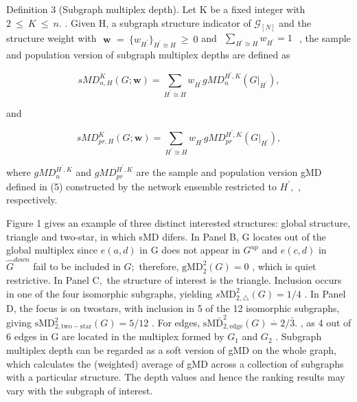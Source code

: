 \documentclass[
  10
]{article}
\begin{document}
Definition 3 (Subgraph multiplex depth). Let K be a fixed integer with
\(2 ~ \leq ~ K ~ \leq ~ n .\) . Given H, a subgraph structure indicator
of \(\mathcal { G } _ { [ N ] }\) and the structure weight with
\(\textbf { w } = \ \{ w _ { H ^ { \prime } } \} _ { H ^ { \prime } \cong H } \ \geq \ 0\)
and
\(\begin{array} { r } { \sum _ { H ^ { \prime } \cong H } w _ { H ^ { \prime } } = 1 } \end{array}\)
, the sample and population version of subgraph multiplex depths are
defined as

\[
s M D _ {n, H} ^ {K} (G; \mathbf {w}) = \sum_ {H ^ {\prime} \cong H} w _ {H ^ {\prime}} g M D _ {n} ^ {H ^ {\prime}, K} (G | _ {H ^ {\prime}}),
\]

and

\[
s M D _ {p r, H} ^ {K} (G; \mathbf {w}) = \sum_ {H ^ {\prime} \cong H} w _ {H ^ {\prime}} g M D _ {p r} ^ {H ^ {\prime}, K} (G | _ {H ^ {\prime}}),
\]

where \(g M D _ { n } ^ { H ^ { \prime } , K }\) and
\(g M D _ { p r } ^ { H ^ { \prime } , K }\) are the sample and
population version gMD defined in (5) constructed by the network
ensemble restricted to \(H ^ { \prime } { , }\) , respectively.

Figure 1 gives an example of three distinct interested structures:
global structure, triangle and two-star, in which sMD difers. In Panel
B, G locates out of the global multiplex since \(e ( a , d )\) in G does
not appear in \(G ^ { u p }\) and \(e ( c , d )\) in
\({ \hat { G } } ^ { d o w n }\) fail to be included in \(G ;\)
therefore, \(\mathrm { g M D } _ { 2 } ^ { 2 } ( G ) = 0\) , which is
quiet restrictive. In Panel \(\mathrm { C } ,\) the structure of
interest is the triangle. Inclusion occurs in one of the four isomorphic
subgraphs, yielding
\(s \mathrm { M D } _ { 2 , \triangle } ^ { 2 } ( G ) = 1 / 4\) . In
Panel D, the focus is on twostars, with inclusion in 5 of the 12
isomorphic subgraphs, giving
\({ \mathrm { s M D } } _ { 2 , \mathrm { t w o - s t a r } } ^ { 2 } ( G ) = 5 / 1 2\)
. For edges,
\(\mathrm { s M } \bar { \mathrm { D } } _ { 2 , \mathrm { e d g e } } ^ { 2 } ( G ) \stackrel { \cdot } { = } 2 / \bar { 3 } .\)
, as 4 out of 6 edges in G are located in the multiplex formed by
\(G _ { 1 }\) and \(G _ { 2 }\) . Subgraph multiplex depth can be
regarded as a soft version of gMD on the whole graph, which calculates
the (weighted) average of gMD across a collection of subgraphs with a
particular structure. The depth values and hence the ranking results may
vary with the subgraph of interest.
\end{document}
